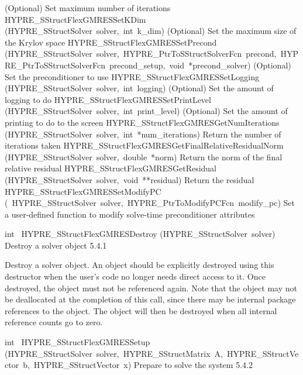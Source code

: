 \documentclass{article}
\begin{document}
\begin{cxxentry}
\begin{cxxentry}
\begin{cxxnames}
{(Optional) Set maximum number of iterations}
        {}
\label{cxx.5.4.7}
        {HYPRE\_SStructFlexGMRESSetKDim}
        {(HYPRE\_SStructSolver\ solver,\ int\ k\_dim)}
        {
(Optional) Set the maximum size of the Krylov space}
        {}
\label{cxx.5.4.8}
        {HYPRE\_SStructFlexGMRESSetPrecond}
        {(HYPRE\_SStructSolver\ solver,\ HYPRE\_PtrToSStructSolverFcn\ precond,\ HYPRE\_PtrToSStructSolverFcn\ precond\_setup,\ void\ *precond\_solver)}
        {
(Optional) Set the preconditioner to use}
        {}
\label{cxx.5.4.9}
        {HYPRE\_SStructFlexGMRESSetLogging}
        {(HYPRE\_SStructSolver\ solver,\ int\ logging)}
        {
(Optional) Set the amount of logging to do}
        {}
\label{cxx.5.4.10}
        {HYPRE\_SStructFlexGMRESSetPrintLevel}
        {(HYPRE\_SStructSolver\ solver,\ int\ print\_level)}
        {
(Optional) Set the amount of printing to do to the screen}
        {}
\label{cxx.5.4.11}
        {HYPRE\_SStructFlexGMRESGetNumIterations}
        {(HYPRE\_SStructSolver\ solver,\ int\ *num\_iterations)}
        {
Return the number of iterations taken}
        {}
\label{cxx.5.4.12}
        {HYPRE\_SStructFlexGMRESGetFinalRelativeResidualNorm}
        {(HYPRE\_SStructSolver\ solver,\ double\ *norm)}
        {
Return the norm of the final relative residual}
        {}
\label{cxx.5.4.13}
        {HYPRE\_SStructFlexGMRESGetResidual}
        {(HYPRE\_SStructSolver\ solver,\ void\ **residual)}
        {
Return the residual}
        {}
\label{cxx.5.4.14}
        {HYPRE\_SStructFlexGMRESSetModifyPC}
        {(\ HYPRE\_SStructSolver\ solver,\ HYPRE\_PtrToModifyPCFcn\ modify\_pc)}
        {
Set a user-defined function to modify solve-time preconditioner attributes}
        {}
\label{cxx.5.4.15}
\end{cxxnames}
\begin{cxxfunction}
{int\ }
        {HYPRE\_SStructFlexGMRESDestroy}
        {(HYPRE\_SStructSolver\ solver)}
        {
Destroy a solver object}
        {5.4.1}
\begin{cxxdoc}

Destroy a solver object.  An object should be explicitly destroyed
using this destructor when the user's code no longer needs direct
access to it.  Once destroyed, the object must not be referenced
again.  Note that the object may not be deallocated at the
completion of this call, since there may be internal package
references to the object.  The object will then be destroyed when
all internal reference counts go to zero.
\end{cxxdoc}
\end{cxxfunction}
\begin{cxxfunction}
{int\ }
        {HYPRE\_SStructFlexGMRESSetup}
        {(HYPRE\_SStructSolver\ solver,\ HYPRE\_SStructMatrix\ A,\ HYPRE\_SStructVector\ b,\ HYPRE\_SStructVector\ x)}
        {
Prepare to solve the system}
        {5.4.2}
\begin{cxxdoc}


\end{cxxdoc}
\end{cxxfunction}
\end{cxxentry}
\end{cxxentry}
\end{document}
